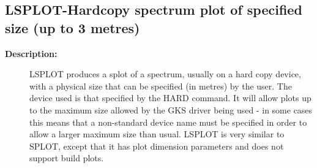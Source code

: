 \subsection{LSPLOT-\label{LSPLOT}Hardcopy spectrum plot of specified size (up to 3 metres)}
\begin{description}

\item [{\bf Description:}]
 LSPLOT produces a splot of a spectrum, usually on a hard copy
 device, with a physical size that can be specified (in metres) by
 the user. The device used is that specified by the HARD command.
 It will allow plots up to the maximum size allowed by the GKS
 driver being used - in some cases this means that a non-standard
 device  name must be specified in order to allow a larger maximum
 size than usual.  LSPLOT is very similar to SPLOT, except that it
 has plot dimension parameters and does not support build plots.


\end{description}
